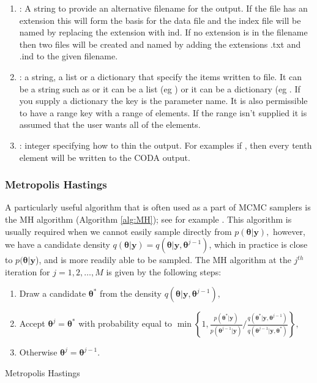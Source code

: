 \documentclass[article]{jss}
\begin{document}
\begin{enumerate}
\begin{enumerate}
\begin{enumerate}
\item {}: A string to provide an alternative filename for the
  output.  If the file has an extension this will form the basis for
  the data file and the index file will be named by replacing the
  extension with ind. If no extension is in the filename then two
  files will be created and named by adding the extensions .txt and
  .ind to the given filename.
\item {}: a string, a list or a dictionary that specify
  the items written to file. It can be a string such as 
  or it can be a list (eg ) or it can be a
  dictionary (eg .  If you
  supply a dictionary the key is the parameter name. It is also
  permissible to have a range key with a range of elements. If the
  range isn't supplied it is assumed that the user wants all of the
  elements.  
\item {}: integer specifying how to thin the output. For
  examples if , then every tenth element will be
  written to the CODA output.
\end{enumerate}
\end{enumerate}
\end{enumerate}

\subsubsection{Metropolis Hastings}
\label{sub:Metropolis-Hastings}

A particularly useful algorithm that is often used as a part of MCMC
samplers is the MH algorithm (Algorithm \ref{alg:MH}); see for example
\citet{RobertCassela1999}. This algorithm is usually required when we
cannot easily sample directly from $p(\bm{\theta}|\bm{y}),$ however,
we have a candidate density
$q(\bm{\theta}|\bm{y})=q(\bm{\theta}|\bm{y},\bm{\theta}^{j-1})$, which
in practice is close to $p(\bm{\theta}|\bm{y}$), and is more readily
able to be sampled. The MH algorithm at the $j^{th}$ iteration for
$j=1,2,\dots,M$ is given by the following steps:

%
\begin{algorithm}[H]
\begin{enumerate}
\item Draw a candidate $\bm{\bm{\theta}}^{\ast}$ from the density $q\left(\bm{\bm{\theta}}|\bm{y},\bm{\theta}^{j-1}\right),$ 
\item Accept $\bm{\theta}^{j}=\bm{\theta}^{\ast}$ with probability equal
to $\min\left\{ 1,\frac{p\left(\bm{\theta}^{\ast}|\bm{y}\right)}{p\left(\bm{\theta}^{j-1}|\bm{y}\right)}/\frac{q\left(\bm{\theta}^{\ast}|\bm{y},\bm{\theta}^{j-1}\right)}{q\left(\bm{\theta}^{j-1}|\bm{y},\bm{\theta}^{*}\right)}\right\} ,$ 
\item Otherwise $\bm{\theta}^{j}=\bm{\theta}^{j-1}.$ 
\end{enumerate}
\caption{Metropolis Hastings}
\label{alg:MH}
\end{algorithm}
\end{document}
